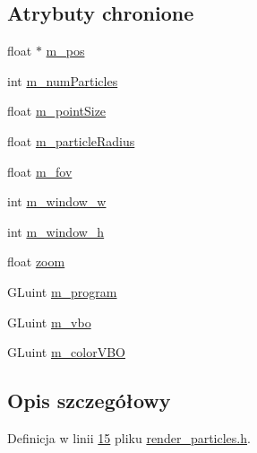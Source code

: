 \subsection*{Atrybuty chronione}
\begin{DoxyCompactItemize}
\item 
float $\ast$ \hyperlink{class_particle_renderer_a1d74720edb5c3a13edcdd176ac0d84c7}{m\-\_\-pos}
\item 
int \hyperlink{class_particle_renderer_af885fdb5e6da925209dfd960f66b5fd8}{m\-\_\-num\-Particles}
\item 
float \hyperlink{class_particle_renderer_a1ca13e546c937cb546c0da19fa853b34}{m\-\_\-point\-Size}
\item 
float \hyperlink{class_particle_renderer_aab5ee3cd769a64c45dc9714aabdb0ee2}{m\-\_\-particle\-Radius}
\item 
float \hyperlink{class_particle_renderer_a0aed003bd557a3c32ca7d2ca89fc59f7}{m\-\_\-fov}
\item 
int \hyperlink{class_particle_renderer_aa71b7eba5d5665a086b7ba80adddf19b}{m\-\_\-window\-\_\-w}
\item 
int \hyperlink{class_particle_renderer_af34b1e93f6a7f22774a6473c52027d77}{m\-\_\-window\-\_\-h}
\item 
float \hyperlink{class_particle_renderer_a065df5c32be72505267048490bd0b3cf}{zoom}
\item 
G\-Luint \hyperlink{class_particle_renderer_ab8f0dd1a6e0f4401012bd46ae8940648}{m\-\_\-program}
\item 
G\-Luint \hyperlink{class_particle_renderer_a7549feaa0982abbc44c9fe73f2eb251f}{m\-\_\-vbo}
\item 
G\-Luint \hyperlink{class_particle_renderer_a7dcaa73a41c598207974432206b423b5}{m\-\_\-color\-V\-B\-O}
\end{DoxyCompactItemize}


\subsection{Opis szczegółowy}


Definicja w linii \hyperlink{render__particles_8h_source_l00015}{15} pliku \hyperlink{render__particles_8h_source}{render\-\_\-particles.\-h}.



